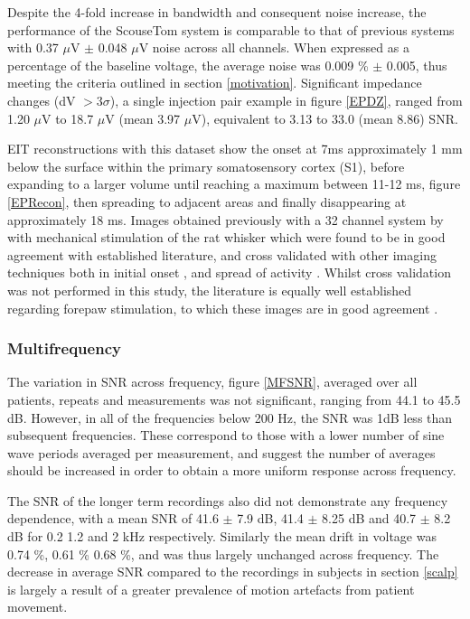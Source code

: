 Despite the 4-fold increase in bandwidth and consequent noise increase, the performance of the ScouseTom system is comparable to that of previous systems \cite{Oh2011} with 0.37 $\mu$V $\pm$ 0.048 $\mu$V noise across all channels. When expressed as a percentage of the baseline voltage, the average noise was 0.009 \% $\pm$ 0.005, thus meeting the criteria outlined in section \ref{motivation}.  Significant impedance changes (dV $> 3\sigma$), a single injection pair example in figure \ref{EPDZ}, ranged from 1.20 $\mu$V to 18.7 $\mu$V (mean 3.97 $\mu$V), equivalent to 3.13 to 33.0 (mean 8.86) SNR. 

EIT reconstructions with this dataset show the onset at 7ms approximately 1 mm below the surface within the primary somatosensory cortex (S1), before expanding to a larger volume until reaching a maximum between 11-12 ms, figure \ref{EPRecon}, then spreading to adjacent areas and finally disappearing at approximately 18 ms. Images obtained previously with a 32 channel system by \citet{Aristovich_2016} with mechanical stimulation of the rat whisker which were found to be in good agreement with established literature, and cross validated with other imaging techniques both in initial onset \cite{armstrong1991thalamo}, and spread of activity \cite{petersen2007functional}. Whilst cross validation was not performed in this study, the literature is equally well established regarding forepaw stimulation, to which these images are in good agreement \cite{peeters2001comparing} \cite{masamoto2007relationship} \cite{lowe2007small}.

\subsubsection{Multifrequency}

The variation in SNR across frequency, figure \ref{MFSNR}, averaged over all patients, repeats and measurements was not significant, ranging from 44.1 to 45.5 dB.  However, in all of the frequencies below 200 Hz, the SNR was 1dB less than subsequent frequencies. These correspond to those with a lower number of sine wave periods averaged per measurement, and suggest the number of averages should be increased in order to obtain a more uniform response across frequency. 

The SNR of the longer term recordings also did not demonstrate any frequency dependence, with a mean SNR of 41.6 $\pm$ 7.9 dB, 41.4 $\pm$ 8.25 dB and 40.7 $\pm$ 8.2 dB for 0.2 1.2 and 2 kHz respectively. Similarly the mean drift in voltage was 0.74 \%, 0.61 \% 0.68 \%, and was thus largely unchanged across frequency. The decrease in average SNR compared to the recordings in subjects in section \ref{scalp} is largely a result of a greater prevalence of motion artefacts from patient movement. 

